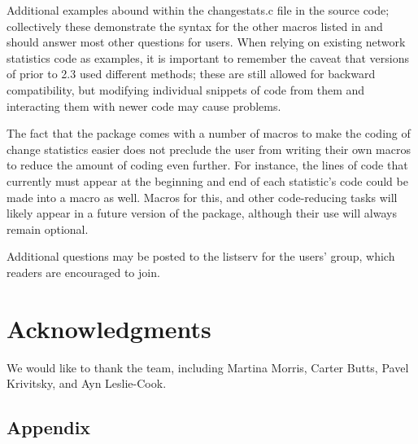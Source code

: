 \documentclass[nojss]{jss}
\begin{document}
Additional examples abound within the changestats.c file in the source code; collectively these demonstrate the syntax for the other macros listed in  and should answer most other questions for users. When relying on existing network statistics code as examples, it is important to remember the caveat that versions of  prior to 2.3 used different methods; these are still allowed for backward compatibility, but modifying individual snippets of code from them and interacting them with newer code may cause problems.  

The fact that the  package comes with a number of macros to make the coding of change statistics easier does not preclude the user from writing their own macros to reduce the amount of coding even further. For instance, the lines of code that currently must appear at the beginning and end of each statistic's  code could be made into a macro as well.  Macros for this, and other code-reducing tasks will likely appear in a future version of the  package, although their use will always remain optional.

Additional questions may be posted to the listserv for the  users' group, which readers are encouraged to join.

\section*{Acknowledgments}

We would like to thank the  team, including Martina Morris, Carter Butts, Pavel Krivitsky, and Ayn Leslie-Cook.



\newpage

\begin{appendix}


\section[appendix]{Appendix}
\label{appendix}

\end{appendix}
\end{document}
